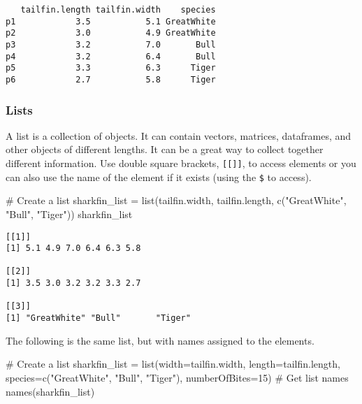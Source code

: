 \documentclass[
  letterpaper,
  DIV=11,
  numbers=noendperiod]{scrartcl}
\newenvironment{Shaded}{\begin{snugshade}}{\end{snugshade}}
\newcommand{\AttributeTok}[1]{\textcolor[rgb]{0.40,0.45,0.13}{#1}}
\newcommand{\CommentTok}[1]{\textcolor[rgb]{0.37,0.37,0.37}{#1}}
\newcommand{\DecValTok}[1]{\textcolor[rgb]{0.68,0.00,0.00}{#1}}
\newcommand{\FunctionTok}[1]{\textcolor[rgb]{0.28,0.35,0.67}{#1}}
\newcommand{\NormalTok}[1]{\textcolor[rgb]{0.00,0.23,0.31}{#1}}
\newcommand{\OtherTok}[1]{\textcolor[rgb]{0.00,0.23,0.31}{#1}}
\newcommand{\StringTok}[1]{\textcolor[rgb]{0.13,0.47,0.30}{#1}}
\begin{document}
\begin{verbatim}
   tailfin.length tailfin.width    species
p1            3.5           5.1 GreatWhite
p2            3.0           4.9 GreatWhite
p3            3.2           7.0       Bull
p4            3.2           6.4       Bull
p5            3.3           6.3      Tiger
p6            2.7           5.8      Tiger
\end{verbatim}

\subsubsection{Lists}\label{lists}

A list is a collection of objects. It can contain vectors, matrices,
dataframes, and other objects of different lengths. It can be a great
way to collect together different information. Use double square
brackets, \texttt{{[}{[}{]}{]}}, to access elements or you can also use
the name of the element if it exists (using the \texttt{\$} to access).

\begin{Shaded}
\begin{Highlighting}[]
\CommentTok{\# Create a list}
\NormalTok{sharkfin\_list }\OtherTok{=} \FunctionTok{list}\NormalTok{(tailfin.width, tailfin.length, }\FunctionTok{c}\NormalTok{(}\StringTok{"GreatWhite"}\NormalTok{, }\StringTok{"Bull"}\NormalTok{, }\StringTok{"Tiger"}\NormalTok{))}
\NormalTok{sharkfin\_list}
\end{Highlighting}
\end{Shaded}

\begin{verbatim}
[[1]]
[1] 5.1 4.9 7.0 6.4 6.3 5.8

[[2]]
[1] 3.5 3.0 3.2 3.2 3.3 2.7

[[3]]
[1] "GreatWhite" "Bull"       "Tiger"     
\end{verbatim}

The following is the same list, but with names assigned to the elements.

\begin{Shaded}
\begin{Highlighting}[]
\CommentTok{\# Create a list}
\NormalTok{sharkfin\_list }\OtherTok{=} \FunctionTok{list}\NormalTok{(}\AttributeTok{width=}\NormalTok{tailfin.width,}
                     \AttributeTok{length=}\NormalTok{tailfin.length,}
                     \AttributeTok{species=}\FunctionTok{c}\NormalTok{(}\StringTok{"GreatWhite"}\NormalTok{, }\StringTok{"Bull"}\NormalTok{, }\StringTok{"Tiger"}\NormalTok{),}
                     \AttributeTok{numberOfBites=}\DecValTok{15}\NormalTok{)}
\CommentTok{\# Get list names}
\FunctionTok{names}\NormalTok{(sharkfin\_list)}
\end{Highlighting}
\end{Shaded}
\end{document}
